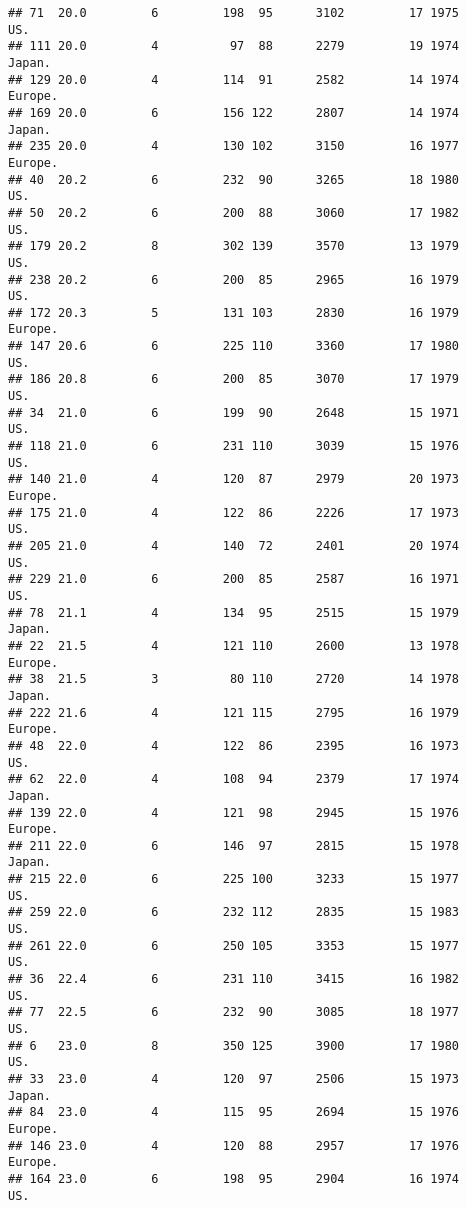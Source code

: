 \documentclass[11pt,]{article}
\begin{document}
\begin{verbatim}
## 71  20.0         6         198  95      3102         17 1975      US.
## 111 20.0         4          97  88      2279         19 1974   Japan.
## 129 20.0         4         114  91      2582         14 1974  Europe.
## 169 20.0         6         156 122      2807         14 1974   Japan.
## 235 20.0         4         130 102      3150         16 1977  Europe.
## 40  20.2         6         232  90      3265         18 1980      US.
## 50  20.2         6         200  88      3060         17 1982      US.
## 179 20.2         8         302 139      3570         13 1979      US.
## 238 20.2         6         200  85      2965         16 1979      US.
## 172 20.3         5         131 103      2830         16 1979  Europe.
## 147 20.6         6         225 110      3360         17 1980      US.
## 186 20.8         6         200  85      3070         17 1979      US.
## 34  21.0         6         199  90      2648         15 1971      US.
## 118 21.0         6         231 110      3039         15 1976      US.
## 140 21.0         4         120  87      2979         20 1973  Europe.
## 175 21.0         4         122  86      2226         17 1973      US.
## 205 21.0         4         140  72      2401         20 1974      US.
## 229 21.0         6         200  85      2587         16 1971      US.
## 78  21.1         4         134  95      2515         15 1979   Japan.
## 22  21.5         4         121 110      2600         13 1978  Europe.
## 38  21.5         3          80 110      2720         14 1978   Japan.
## 222 21.6         4         121 115      2795         16 1979  Europe.
## 48  22.0         4         122  86      2395         16 1973      US.
## 62  22.0         4         108  94      2379         17 1974   Japan.
## 139 22.0         4         121  98      2945         15 1976  Europe.
## 211 22.0         6         146  97      2815         15 1978   Japan.
## 215 22.0         6         225 100      3233         15 1977      US.
## 259 22.0         6         232 112      2835         15 1983      US.
## 261 22.0         6         250 105      3353         15 1977      US.
## 36  22.4         6         231 110      3415         16 1982      US.
## 77  22.5         6         232  90      3085         18 1977      US.
## 6   23.0         8         350 125      3900         17 1980      US.
## 33  23.0         4         120  97      2506         15 1973   Japan.
## 84  23.0         4         115  95      2694         15 1976  Europe.
## 146 23.0         4         120  88      2957         17 1976  Europe.
## 164 23.0         6         198  95      2904         16 1974      US.

\end{verbatim}
\end{document}

